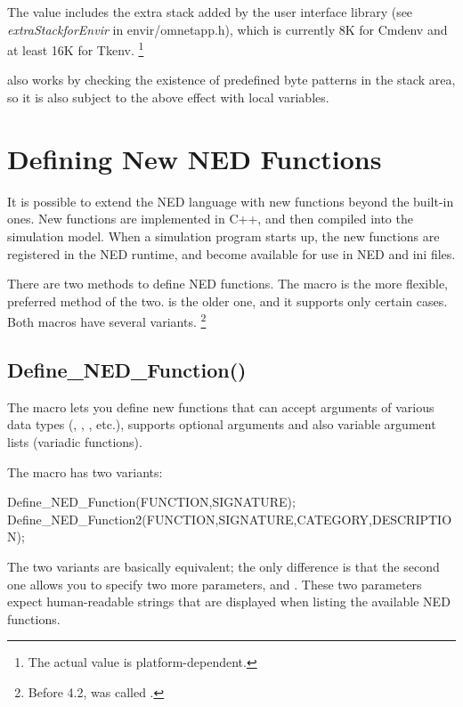 The value includes the extra stack added by the user interface library
(see \textit{extraStackforEnvir} in
envir/omnetapp.h), which is currently 8K for Cmdenv and at least 16K
for Tkenv.
  \footnote{The actual value is platform-dependent.}

 also works by checking the existence of predefined
byte patterns in the stack area, so it is also subject to the above
effect with local variables.


\section{Defining New NED Functions}
\label{sec:ch-sim-lib:defining-ned-functions}

It is possible to extend the NED language with new functions beyond the
built-in ones. New functions are implemented in C++, and then compiled into
the simulation model. When a simulation program starts up, the new
functions are registered in the NED runtime, and become available for use
in NED and ini files.

There are two methods to define NED functions. The
 macro is the more flexible, preferred method
of the two.  is the older one, and it
supports only certain cases. Both macros have several variants.
  \footnote{Before {\opp} 4.2,  was
  called .}

\subsection{Define\_NED\_Function()}

The  macro lets you define new functions that
can accept arguments of various data types (, ,
, etc.), supports optional arguments and also variable
argument lists (variadic functions).

The macro has two variants:

\begin{cpp}
Define_NED_Function(FUNCTION,SIGNATURE);
Define_NED_Function2(FUNCTION,SIGNATURE,CATEGORY,DESCRIPTION);
\end{cpp}

The two variants are basically equivalent; the only difference is that the
second one allows you to specify two more parameters,  and
. These two parameters expect human-readable strings that
are displayed when listing the available NED functions.

